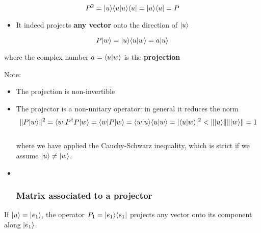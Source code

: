 \documentclass[11pt]{article}
\providecommand{\tightlist}{%
      \setlength{\itemsep}{0pt}\setlength{\parskip}{0pt}}
\begin{document}
\[
P^2 = |u\rangle\langle u|u\rangle\langle u| = | u\rangle \langle u| = P
\]

    \begin{itemize}
\tightlist
\item
  It indeed projects \textbf{any vector} onto the direction of
  \(|u\rangle\)
\end{itemize}

\[
P |w\rangle = |u\rangle\langle u|w\rangle = a |u\rangle
\]

where the complex number \(a = \langle u|w\rangle\) is the
\textbf{projection}

    Note:

\begin{itemize}
\item
  The projection is non-invertible
\item
  The projector is a non-unitary operator: in general it reduces the
  norm \[
  \| P|w\rangle\|^2 = \langle w|P^\dagger P|w\rangle = \langle w| P|w\rangle= \langle w|u\rangle\langle u|w\rangle = |\langle u|w\rangle|^2 < \||u\rangle\|\||w\rangle\| = 1  
  \] \\
  where we have applied the Cauchy-Schwarz inequality, which is strict
  if we assume \(|u\rangle \neq |w\rangle\).
\end{itemize}

    \begin{itemize}
\item ~
  \subsubsection{Matrix associated to a
  projector}\label{matrix-associated-to-a-projector}
\end{itemize}

If \(|u\rangle = |e_1\rangle\), the operator \(P_1 = |e_1\rangle\langle e_1|\)
projects any vector onto its component along \(|e_1\rangle\).\\
\end{document}
